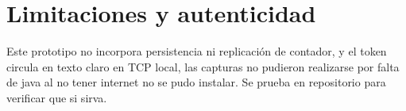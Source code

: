 \documentclass[10pt,a4paper]{article}
\begin{document}
\section*{Limitaciones y autenticidad}
Este prototipo no incorpora persistencia ni replicación de contador, y el token circula en texto claro en TCP local, las capturas no pudieron realizarse por falta de java al no tener internet no se pudo instalar. Se prueba en repositorio para verificar que si sirva.
\end{document}
